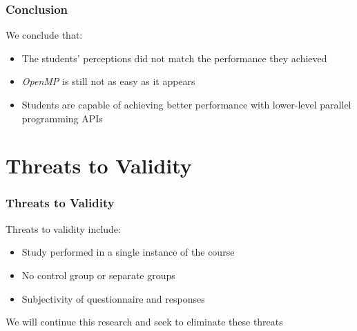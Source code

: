 \documentclass[10pt, compress, aspectratio=169]{beamer}
\begin{document}
\begin{frame}
    \frametitle{Conclusion}
    We conclude that:

    \begin{itemize}
        \item The students' perceptions did not match the performance they
            achieved
        \item \textit{OpenMP} is still not as easy as it appears
        \item Students are capable of achieving better performance with
            lower-level parallel programming APIs
    \end{itemize}
\end{frame}

\section{Threats to Validity}

\begin{frame}
    \frametitle{Threats to Validity}
    Threats to validity include:

    \begin{itemize}
        \item Study performed in a single instance of the course
            \pause
        \item No control group or separate groups
            \pause
        \item Subjectivity of questionnaire and responses
    \end{itemize}

    We will continue this research and seek to eliminate these threats
\end{frame}

\maketitle
\end{document}
